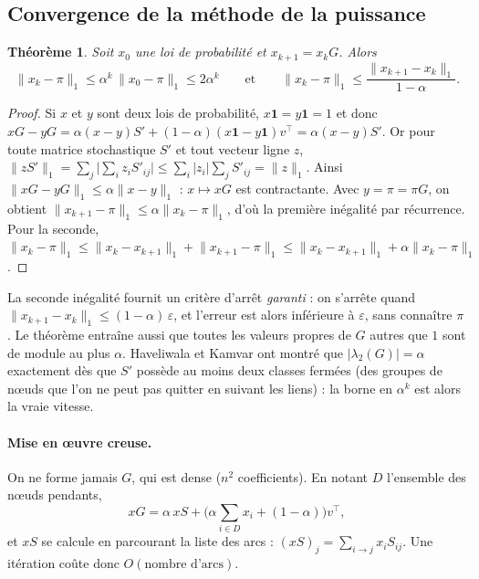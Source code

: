 \documentclass[11pt,a4paper]{article}
\newtheorem{theoreme}{Théorème}
\theoremstyle{remark}
\newcommand{\1}{\mathbf{1}}
\begin{document}
\subsection{Convergence de la méthode de la puissance}

\begin{theoreme}\label{thm:pagerank}
Soit $x_0$ une loi de probabilité et $x_{k+1} = x_k G$. Alors
\[
  \lVert x_k - \pi\rVert_1 \le \alpha^k\, \lVert x_0 - \pi\rVert_1 \le 2\alpha^k
  \qquad\text{et}\qquad
  \lVert x_k - \pi\rVert_1 \le \frac{\lVert x_{k+1} - x_k\rVert_1}{1-\alpha}.
\]
\end{theoreme}

\begin{proof}
Si $x$ et $y$ sont deux lois de probabilité, $x\1 = y\1 = 1$ et donc $xG - yG = \alpha (x - y) S' + (1-\alpha)(x\1 - y\1) v^\top = \alpha (x-y) S'$. Or pour toute matrice stochastique $S'$ et tout vecteur ligne $z$,
$\lVert zS'\rVert_1 = \sum_j \big|\sum_i z_i S'_{ij}\big| \le \sum_i |z_i| \sum_j S'_{ij} = \lVert z\rVert_1$. Ainsi $\lVert xG - yG\rVert_1 \le \alpha\lVert x - y\rVert_1$ : $x \mapsto xG$ est contractante. Avec $y = \pi = \pi G$, on obtient $\lVert x_{k+1} - \pi\rVert_1 \le \alpha\lVert x_k - \pi\rVert_1$, d'où la première inégalité par récurrence. Pour la seconde, $\lVert x_k - \pi\rVert_1 \le \lVert x_k - x_{k+1}\rVert_1 + \lVert x_{k+1} - \pi\rVert_1 \le \lVert x_k - x_{k+1}\rVert_1 + \alpha\lVert x_k - \pi\rVert_1$.
\end{proof}

La seconde inégalité fournit un critère d'arrêt \emph{garanti} : on s'arrête quand $\lVert x_{k+1} - x_k\rVert_1 \le (1-\alpha)\,\varepsilon$, et l'erreur est alors inférieure à $\varepsilon$, sans connaître $\pi$. Le théorème entraîne aussi que toutes les valeurs propres de $G$ autres que $1$ sont de module au plus $\alpha$. Haveliwala et Kamvar \cite{haveliwala} ont montré que $|\lambda_2(G)| = \alpha$ exactement dès que $S'$ possède au moins deux classes fermées (des groupes de n\oe uds que l'on ne peut pas quitter en suivant les liens) : la borne en $\alpha^k$ est alors la vraie vitesse.

\paragraph{Mise en \oe uvre creuse.} On ne forme jamais $G$, qui est dense ($n^2$ coefficients). En notant $D$ l'ensemble des n\oe uds pendants,
\[
  xG = \alpha\, xS + \Big(\alpha \sum_{i\in D} x_i + (1-\alpha)\Big) v^\top ,
\]
et $xS$ se calcule en parcourant la liste des arcs : $(xS)_j = \sum_{i \to j} x_i S_{ij}$. Une itération coûte donc $O(\text{nombre d'arcs})$.
\end{document}
